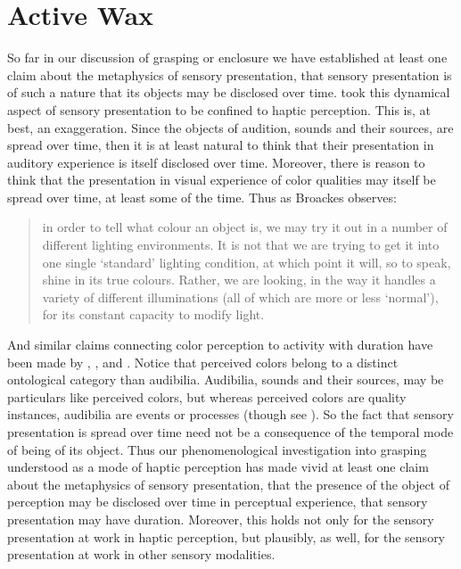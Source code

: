 \section{Active Wax} %
\label{sec:active_wax}

So far in our discussion of grasping or enclosure we have established at least one claim about the metaphysics of sensory presentation, that sensory presentation is of such a nature that its objects may be disclosed over time. \citet{Broad:1952kx} took this dynamical aspect of sensory presentation to be confined to haptic perception. This is, at best, an exaggeration. Since the objects of audition, sounds and their sources, are spread over time, then it is at least natural to think that their presentation in auditory experience is itself disclosed over time. Moreover, there is reason to think that the presentation in visual experience of color qualities may itself be spread over time, at least some of the time. Thus as Broackes observes: 
\begin{quote}
	in order to tell what colour an object is, we may try it out in a number of different lighting environments. It is not that we are trying to get it into one single `standard' lighting condition, at which point it will, so to speak, shine in its true colours. Rather, we are looking, in the way it handles a variety of different illuminations (all of which are more or less `normal'), for its constant capacity to modify light. \citep[215]{Broackes:1997pa}
\end{quote}
And similar claims connecting color perception to activity with duration have been made by \citet{Noe:2004fk}, \citet{Matthen:2005md}, and \citet{Kalderon:2008fk}. Notice that perceived colors belong to a distinct ontological category than audibilia. Audibilia, sounds and their sources, may be particulars like perceived colors, but whereas perceived colors are quality instances, audibilia are events or processes (though see \citealt{Pasnau:2009ys}). So the fact that sensory presentation is spread over time need not be a consequence of the temporal mode of being of its object. Thus our phenomenological investigation into grasping understood as a mode of haptic perception has made vivid at least one claim about the metaphysics of sensory presentation, that the presence of the object of perception may be disclosed over time in perceptual experience, that sensory presentation may have duration. Moreover, this holds not only for the sensory presentation at work in haptic perception, but plausibly, as well, for the sensory presentation at work in other sensory modalities.

